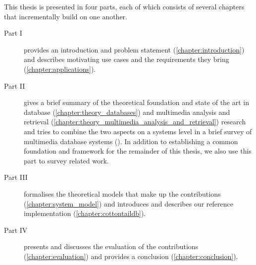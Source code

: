 This thesis is presented in four parts, each of which consists of several chapters that incrementally build on one another.

\begin{description}
    \item[Part I] provides an introduction and problem statement (\cref{chapter:introduction}) and describes motivating use cases and the requirements they bring (\cref{chapter:applications}).
    \item[Part II] gives a brief summary of the theoretical foundation and state of the art in database (\cref{chapter:theory_databases}) and multimedia analysis and retrieval (\cref{chapter:theory_multimedia_analysis_and_retrieval}) research and tries to combine the two aspects on a systems level in a brief survey of multimedia database systems (). In addition to establishing a common foundation and framework for the remainder of this thesis, we also use this part to survey related work.
    \item[Part III] formalises the theoretical models that make up the contributions (\cref{chapter:system_model}) and introduces and describes our reference implementation \cottontail{} (\cref{chapter:cottontaildb}).
    \item[Part IV] presents and discusses the evaluation of the contributions (\cref{chapter:evaluation}) and provides a conclusion (\cref{chapter:conclusion}).
\end{description}